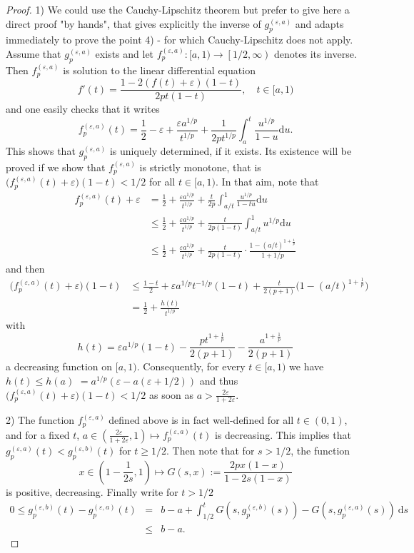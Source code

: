 \documentclass[a4, 11pt]{article}
\numberwithin{equation}{section}
\theoremstyle{plain}
\theoremstyle{definition}
\theoremstyle{remark}
\begin{document}
\begin{proof}
	1) We could use the Cauchy-Lipschitz theorem but prefer to give here a direct proof "by hands", that gives explicitly the inverse of $g_p^{(\varepsilon,a)}$ and adapts immediately to prove the point 4) - for which Cauchy-Lipschitz does not apply. Assume that $g_p^{(\varepsilon,a)}$ exists and let $f_p^{(\varepsilon,a)}:[a,1)\to \left[1/2,\infty\right)$ denotes its inverse. Then $f_p^{(\varepsilon,a)}$ is solution to the linear differential equation
	$$f'(t)=\frac{1-2(f(t)+\varepsilon)(1-t)}{2pt(1-t)}, \quad t\in [a,1)$$ 
and one easily checks that it writes
$$f_p^{(\varepsilon,a)}(t)=\frac{1}{2}-\varepsilon + \frac{\varepsilon a^{1/p}}{t^{1/p}}+\frac{1}{2pt^{1/p}}\int_{a}^t  \frac{u^{1/p}}{1-u}\mathrm{d}u.$$
This shows that $g_p^{(\varepsilon,a)}$ is uniquely determined, if it exists. Its existence will be proved if we show that $f_p^{(\varepsilon,a)}$ is strictly monotone, that is $\big(f_p^{(\varepsilon,a)}(t)+\varepsilon \big)(1-t)<1/2$ for all $t\in [a,1)$. In that aim, note that
\begin{align*}
	f_p^{(\varepsilon,a)}(t)+\varepsilon&=\frac{1}{2}+ \frac{\varepsilon a^{1/p}}{t^{1/p}}+\frac{t}{2p}\int_{a/t}^1 \frac{u^{1/p}}{1-tu}\mathrm{d}u\\
	&\leq \frac{1}{2}+ \frac{\varepsilon a^{1/p}}{t^{1/p}}+\frac{t}{2p(1-t)}\int_{a/t}^1 u^{1/p}\mathrm{d}u\\
	&\leq \frac{1}{2}+ \frac{\varepsilon a^{1/p}}{t^{1/p}}+\frac{t}{2p(1-t)} \cdot \frac{1-\left(a/t\right)^{1+\frac{1}{p}}}{1+1/p}
\end{align*} 
and then
\begin{align*}
	\big(f_p^{(\varepsilon,a)}(t)+\varepsilon \big)(1-t)&\leq \frac{1-t}{2}+\varepsilon a^{1/p}t^{-1/p}(1-t)+\frac{t}{2(p+1)}\big(1-\left(a/t\right)^{1+\frac{1}{p}}\big)\\
	&=\frac{1}{2}+\frac{h(t)}{t^{1/p}}
\end{align*}      
with 
$$h(t)=\varepsilon a^{1/p}(1-t)-\frac{pt^{1+\frac{1}{p}}}{2(p+1)}-\frac{a^{1+\frac{1}{p}}}{2(p+1)}$$
a decreasing function on $[a,1)$. Consequently, for every $t\in [a,1)$ we have $h(t)\leq h(a)$ \linebreak $=a^{1/p}\left(\varepsilon-a\left(\varepsilon +1/2\right)\right) $ and thus $\big(f^{(\varepsilon,a)}_p(t)+\varepsilon\big)(1-t)<1/2 $ as soon as $a>\frac{2\varepsilon}{1+2\varepsilon}$.   

2) The function $f^{(\varepsilon,a)}_p$ defined above is in fact well-defined for all $t \in (0,1)$, and for a fixed $t$, $a \in \left(\frac{2\varepsilon}{1+2\varepsilon},1 \right) \mapsto f^{(\varepsilon,a)}_p(t)$ is decreasing. This implies that $g_p^{(\varepsilon,a)}(t)<g_p^{(\varepsilon,b)}(t)$ for $t \geq 1/2$. 
Then note that for $s>1/2$, the function
$$
x \in  \left(1-\frac{1}{2s},1\right)\mapsto G(s,x):=\frac{2px(1-x)}{1-2s(1-x)}
$$           
 is positive, decreasing. Finally write for $t>1/2$
\begin{eqnarray*}
0 \leq g_p^{(\varepsilon,b)}(t) -g_p^{(\varepsilon,a)}(t) &=& b-a+\int_{1/2}^{t}  G(s,g_p^{(\varepsilon,b)}(s))-G(s,g_p^{(\varepsilon,a)}(s)) ~ \mathrm ds \\
&\leq & b-a.
\end{eqnarray*}
	

\end{proof}
\end{document}
